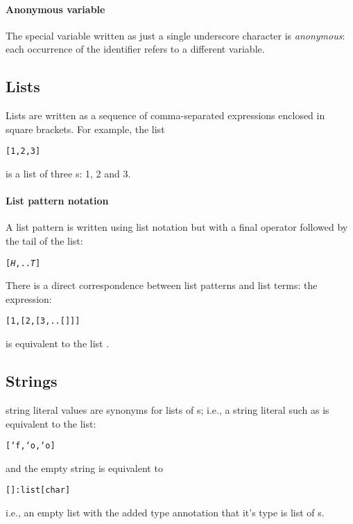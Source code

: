 \paragraph{Anonymous variable}
The special variable written as just a single underscore character \q{\_} is \emph{anonymous}:  each occurrence of the \q{\_} identifier refers to a different variable.

\subsection{Lists}
\label{expression:lists}

Lists are written as a sequence of comma-separated expressions enclosed in square brackets. For example, the list
\begin{alltt}
[1,2,3]
\end{alltt}
is a list of three s: 1, 2 and 3.

\paragraph{List pattern notation}
A list pattern is written using list notation but with a final  operator followed by the tail of the list:
\begin{alltt}
[\emph{H},..\emph{T}]
\end{alltt}
There is a direct correspondence between list patterns and list terms: the expression:
\begin{alltt}
[1,[2,[3,..[]]]
\end{alltt}
is equivalent to the list \q{[1,2,3]}.

\subsection{Strings}
\label{expression:string}
\go string literal values are synonyms for lists of s; i.e., a string literal such as  is equivalent to the list:
\begin{alltt}
[`f,`o,`o]
\end{alltt}
and the empty string  is equivalent to
\begin{alltt}
[]:list[char]
\end{alltt}
i.e., an empty list with the added type annotation that it's type is list of s.


